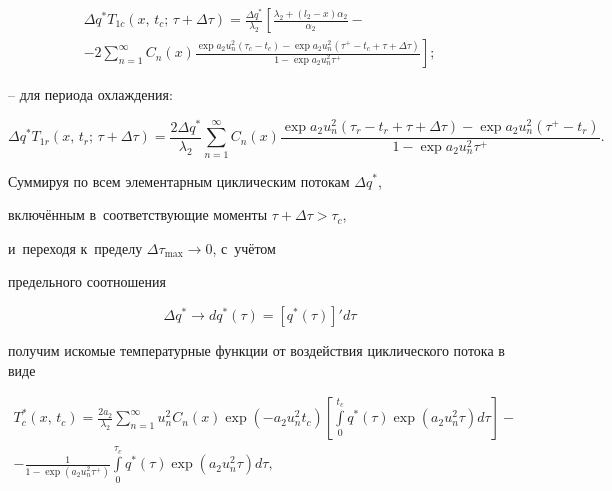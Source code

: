 \begin{multline*}

\Delta q^\ast T_{1c} (x,\,t_c;\,\tau + \Delta \tau ) = \frac{\Delta q^\ast 

}{\lambda _2 }\left[ \frac{\lambda _2 + (l_2 - x)\alpha _2 }{\alpha _2 } - \right.

\\

\left.

-

2\sum\limits_{n = 1}^\infty {C_n (x)\frac{\exp a_2 u_n^2 (\tau _c - t_c ) - 

\exp a_2 u_n^2 (\tau ^ + - t_c + \tau + \Delta \tau )}{1 - \exp a_2 u_n^2 

\tau ^ + }}  \right];

\end{multline*}



-- для периода охлаждения:

\[

\Delta q^\ast T_{1r} (x,\,t_r ;\,\tau + \Delta \tau ) = \frac{2\Delta q^\ast 

}{\lambda _2 }\sum\limits_{n = 1}^\infty {C_n (x)\frac{\exp a_2 u_n^2 (\tau 

_r - t_r + \tau + \Delta \tau ) - \exp a_2 u_n^2 (\tau ^ + - t_r )}{1 - \exp 

a_2 u_n^2 \tau ^ + }} .

\]







Суммируя по всем элементарным циклическим потокам $\Delta q^\ast $, 

включённым в~соответствующие моменты $\tau + \Delta \tau > \tau _c $, 

и~переходя к~пределу $\Delta \tau _{\max } \to 0$, с~учётом 

предельного соотношения 

\[

\Delta q^\ast \to dq^\ast (\tau ) = [q^\ast (\tau )]'d\tau 

\]

получим искомые температурные функции от воздействия циклического потока в виде

\begin{multline}

T_c^\ast (x,\,t_c ) = \frac{2a_2 }{\lambda _2 }\sum\limits_{n = 1}^\infty 

u_n^2 C_n (x)\exp \left( - a_2 u_n^2 t_c \right)\left[ \int\limits_0^{t_c } q^\ast 

(\tau )\exp \left(a_2 u_n^2 \tau \right)d\tau   \right] -  

\\

\label{evdok:eq21}

 - \frac1 { 1 - \exp \left(a_2 u_n^2 \tau ^ + \right) }\int\limits_0^{\tau 

_c } q^\ast (\tau )\exp \left(a_2 u_n^2 \tau \right)d\tau  ,

\end{multline}

